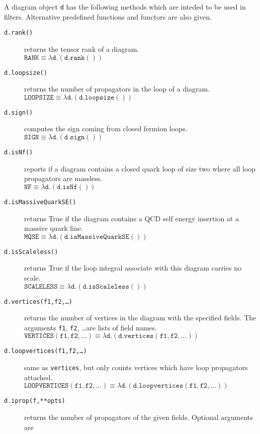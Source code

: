 \documentclass[11pt,a4paper]{refrep}
\begin{document}
A diagram object \texttt{d} has the following methods which are inteded
to be used in filters.
Alternative predefined functions and functors are also given.
\begin{description}
\item[\texttt{d.rank()}] returns the tensor rank of a diagram.\\
   $\mathtt{RANK}\equiv\lambda\mathtt{d}.(\mathtt{d.rank()})$
\item[\texttt{d.loopsize()}] returns the number of propagators
   in the loop of a diagram.\\
   $\mathtt{LOOPSIZE}\equiv\lambda\mathtt{d}.(\mathtt{d.loopsize()})$
\item[\texttt{d.sign()}] computes the sign coming from closed
   fermion loops.\\
   $\mathtt{SIGN}\equiv\lambda\mathtt{d}.(\mathtt{d.sign()})$
\item[\texttt{d.isNf()}] reports if a diagram contains a closed
   quark loop of size two where all loop propagators are massless.\\
   $\mathtt{NF}\equiv\lambda\mathtt{d}.(\mathtt{d.isNf()})$
\item[\texttt{d.isMassiveQuarkSE()}] returns True if the diagram
   contains a QCD self energy insertion at a massive quark line.\\
   $\mathtt{MQSE}\equiv\lambda\mathtt{d}.(\mathtt{d.isMassiveQuarkSE()})$
\item[\texttt{d.isScaleless()}] returns True if the loop integral associate
   with this diagram carries no scale.\\
   $\mathtt{SCALELESS}\equiv\lambda\mathtt{d}.(\mathtt{d.isScaleless()})$
\item[\texttt{d.vertices(f1,f2,\ldots)}] returns the number of vertices
   in the diagram with the specified fields. The arguments \texttt{f1},
   \texttt{f2}, \dots are lists of field names.\\
   $\mathtt{VERTICES(f1,f2,\ldots)}\equiv%
    \lambda\mathtt{d}.(\mathtt{d.vertices(\mathtt{f1},\mathtt{f2},\ldots)})$
\item[\texttt{d.loopvertices(f1,f2,\ldots)}]
   same as \texttt{vertices}, but only counts vertices which have
   loop propagators attached.\\
   $\mathtt{LOOPVERTICES(f1,f2,\ldots)}\equiv%
    \lambda\mathtt{d}.(\mathtt{d.loopvertices(%
    \mathtt{f1},\mathtt{f2},\ldots)})$
\item[\texttt{d.iprop(f,**opts)}] returns the number of propagators
   of the given fields. Optional arguments are

\end{description}
\end{document}
